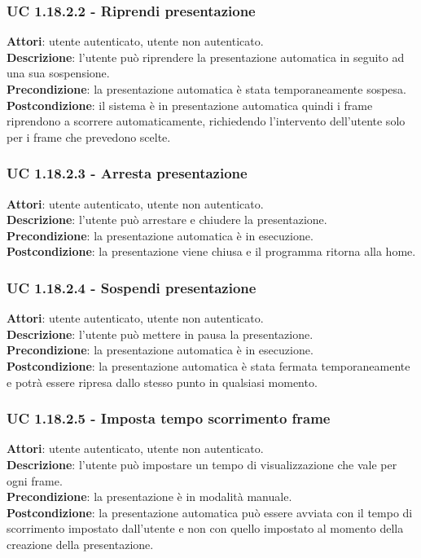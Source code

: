 	\subsubsection{UC 1.18.2.2 - Riprendi presentazione}{
		\label{uc1.18.2.2}
		\textbf{Attori}: utente autenticato, utente non autenticato. \\
		\textbf{Descrizione}: l'utente può riprendere la presentazione automatica in seguito ad una sua sospensione. \\
		\textbf{Precondizione}: la presentazione automatica è stata temporaneamente sospesa.	\\
		\textbf{Postcondizione}: il sistema è in presentazione automatica quindi i frame riprendono a scorrere automaticamente, richiedendo l'intervento dell'utente solo per i frame che prevedono scelte.
	}
	\subsubsection{UC 1.18.2.3 - Arresta presentazione}{
		\label{uc1.18.2.3}
		\textbf{Attori}: utente autenticato, utente non autenticato. \\
		\textbf{Descrizione}: l'utente può arrestare e chiudere la presentazione. \\
		\textbf{Precondizione}: la presentazione automatica è in esecuzione.	\\
		\textbf{Postcondizione}: la presentazione viene chiusa e il programma ritorna alla home.
	}
	\subsubsection{UC 1.18.2.4 - Sospendi presentazione}{
		\label{uc1.18.2.4}
		\textbf{Attori}: utente autenticato, utente non autenticato. \\
		\textbf{Descrizione}: l'utente può mettere in pausa la presentazione. \\
		\textbf{Precondizione}: la presentazione automatica è in esecuzione.	\\
		\textbf{Postcondizione}: la presentazione automatica è stata fermata temporaneamente e potrà essere ripresa dallo stesso punto in qualsiasi momento.
	}
	\subsubsection{UC 1.18.2.5 - Imposta tempo scorrimento frame}{
		\label{uc1.18.2.5}
		\textbf{Attori}: utente autenticato, utente non autenticato. \\
		\textbf{Descrizione}: l'utente può impostare un tempo di visualizzazione che vale per ogni frame. \\
		\textbf{Precondizione}: la presentazione è in modalità manuale.	\\
		\textbf{Postcondizione}: la presentazione automatica può essere avviata con il tempo di scorrimento impostato dall'utente e non con quello impostato al momento della creazione della presentazione.
	}
